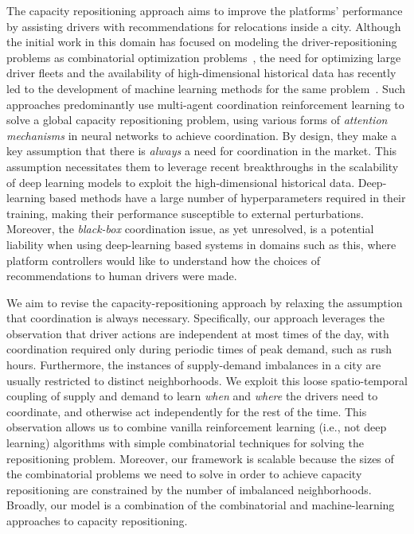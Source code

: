 The capacity repositioning approach aims to improve the platforms' performance
    by assisting drivers with recommendations for relocations inside a city. 
Although the initial work in this domain has focused on modeling the 
    driver-repositioning problems as combinatorial optimization
    problems~\cite{Lee2004-hh, Zhang2016-vz, Seow2010-qg,Xu2018-xb, Zhang2017-id}, 
    the need for optimizing large driver fleets and the availability of 
    high-dimensional historical data has recently led to the development of 
    machine learning methods for the same problem~\cite{Mnih2013-sj,Tang2019-xu,
    Lin2018-vs, Wen2017-vp, Wang2018-bv}. 
Such approaches predominantly use multi-agent coordination reinforcement
    learning to solve a global capacity repositioning problem, using various 
    forms of \emph{attention mechanisms} in neural networks to achieve coordination.
By design, they make a key 
    assumption that there is \emph{always} a need for coordination in the market. 
This assumption necessitates them to leverage recent breakthroughs
    in the scalability of deep learning models to exploit the high-dimensional
    historical data.
Deep-learning based methods have a
    large number of hyperparameters required in their training, making their 
    performance susceptible to external perturbations.
Moreover, the \emph{black-box} coordination issue, as yet unresolved, is a
    potential liability when using deep-learning based systems in domains such
    as this, where platform controllers would like to understand how the
    choices of recommendations to human drivers were made.

We aim to revise the capacity-repositioning approach by relaxing the assumption 
    that coordination is always necessary.  
Specifically, our approach leverages the
    observation that driver actions are independent
    at most times of the day, with coordination required only during periodic
    times of peak demand, such as rush hours. 
Furthermore, the instances of supply-demand imbalances in a city are usually 
    restricted to distinct neighborhoods.
We exploit this loose spatio-temporal coupling of supply and demand to
    learn \emph{when} and \emph{where} the drivers need to coordinate, and 
    otherwise act independently for the rest of the time.
This observation allows us to combine vanilla reinforcement learning 
    (i.e., not deep learning) algorithms with simple combinatorial techniques 
    for solving the repositioning problem.
Moreover, our framework is scalable because the 
    sizes of the combinatorial problems we need to solve in order to 
    achieve capacity repositioning are constrained by the number of 
    imbalanced neighborhoods.
Broadly, our model is a combination of the 
    combinatorial and machine-learning approaches to capacity repositioning.


